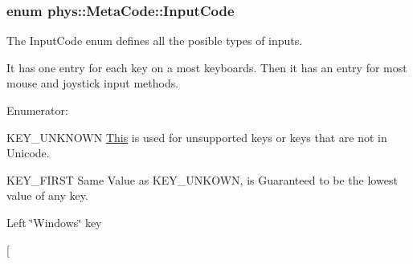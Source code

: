\hypertarget{classphys_1_1MetaCode_a3e501cbb5bf0f6f1fdb7211465bda8d8}{
\subsubsection[{InputCode}]{\setlength{\rightskip}{0pt plus 5cm}enum {\bf phys::MetaCode::InputCode}}}
\label{da/dc9/classphys_1_1MetaCode_a3e501cbb5bf0f6f1fdb7211465bda8d8}


The InputCode enum defines all the posible types of inputs. 

It has one entry for each key on a most keyboards. Then it has an entry for most mouse and joystick input methods. \begin{Desc}
\item[Enumerator: ]\par
\begin{description}
\item[{\em 
\hypertarget{classphys_1_1MetaCode_a3e501cbb5bf0f6f1fdb7211465bda8d8a061a36c9b5d9661314fd9d276b33042f}{
KEY\_\-UNKNOWN}
\label{da/dc9/classphys_1_1MetaCode_a3e501cbb5bf0f6f1fdb7211465bda8d8a061a36c9b5d9661314fd9d276b33042f}
}]KEY\_\-UNKNOWN \hyperlink{structThis}{This} is used for unsupported keys or keys that are not in Unicode. \item[{\em 
\hypertarget{classphys_1_1MetaCode_a3e501cbb5bf0f6f1fdb7211465bda8d8a45d7f3824a440f5bea5e616a6d6ea0b5}{
KEY\_\-FIRST}
\label{da/dc9/classphys_1_1MetaCode_a3e501cbb5bf0f6f1fdb7211465bda8d8a45d7f3824a440f5bea5e616a6d6ea0b5}
}]KEY\_\-FIRST Same Value as KEY\_\-UNKOWN, is Guaranteed to be the lowest value of any key. \item[{\em 
\hypertarget{classphys_1_1MetaCode_a3e501cbb5bf0f6f1fdb7211465bda8d8aab77afaba4fc97faa9b9fe40d3a9ebbb}{
KEY\_\-LSUPER}
\label{da/dc9/classphys_1_1MetaCode_a3e501cbb5bf0f6f1fdb7211465bda8d8aab77afaba4fc97faa9b9fe40d3a9ebbb}
}]Left \char`\"{}Windows\char`\"{} key \item[{\em 
}
\end{description}
\end{Desc}
